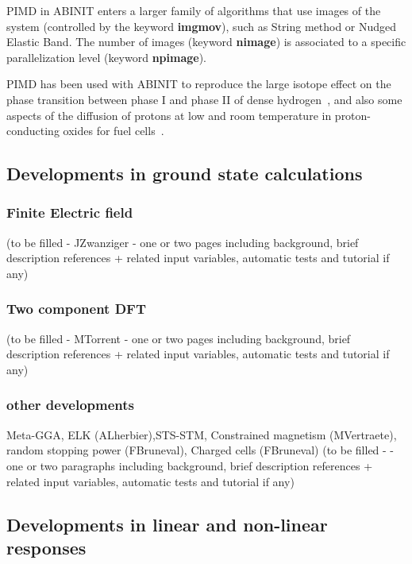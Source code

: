 \documentclass{elsart}
\begin{document}
PIMD in ABINIT enters a larger family of algorithms that use images of the system (controlled by the keyword {\bf imgmov}), such as String method or Nudged Elastic Band. The number of images (keyword {\bf nimage}) is associated to a specific parallelization level (keyword {\bf npimage}).


PIMD has been used with ABINIT to reproduce the large isotope effect on the phase transition between phase I and phase II of
dense hydrogen~\cite{Geneste12}, and also some aspects of the diffusion of protons at low and room temperature in
proton-conducting oxides for fuel cells~\cite{Geneste15}.



\subsection{Developments in ground state calculations}

\subsubsection{ Finite Electric field}
(to be filled - JZwanziger - one or two pages including background, brief description references + related input variables, automatic tests and tutorial if any)

\subsubsection{Two component DFT }
(to be filled - MTorrent - one or two pages including background, brief description references + related input variables, automatic tests and tutorial if any)

\subsubsection{other developments}
Meta-GGA, ELK (ALherbier),STS-STM, Constrained magnetism (MVertraete), random stopping power (FBruneval), Charged cells (FBruneval)
(to be filled -  - one or two paragraphs including background, brief description references + related input variables, automatic tests and tutorial if any)
 

\subsection{Developments in linear and non-linear responses}
\end{document}
